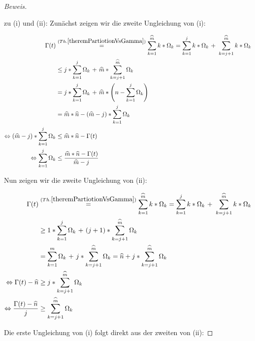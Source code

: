 \begin{proof}[Beweis] \textrm{ }

\vspace{0.3cm}

zu (i) und (ii): Zunächst zeigen wir die zweite Ungleichung von (i):

\begin{align*}
\Gamma(t) &\overset{(Th. \ref{theremPartiotionVsGamma})}{=} \sum_{k=1}^{\widehat{m}} k * \Omega_k = \sum_{k=1}^{j} k * \Omega_k \textrm{  +  } \sum_{k=j+1}^{\widehat{m}} k * \Omega_k \\
&\leq j * \sum_{k=1}^{j} \Omega_k \textrm{  +  } \widehat{m} * \sum_{k=j+1}^{\widehat{m}} \Omega_k \\
&= j * \sum_{k=1}^{j} \Omega_k \textrm{  +  } \widehat{m} * \left( n - \sum_{k=1}^{j} \Omega_k \right) \\
&= \widehat{m} * \widehat{n} - (\widehat{m} - j) * \sum_{k=1}^{j} \Omega_k \\
\Leftrightarrow (\widehat{m} - j) * \sum_{k=1}^{j} \Omega_k &\leq \widehat{m} * \widehat{n} - \Gamma(t) \\
\Leftrightarrow \sum_{k=1}^{j} \Omega_k &\leq \frac{\widehat{m} * \widehat{n} - \Gamma(t)}{\widehat{m} - j}
\end{align*}

\vspace{0.3cm}

Nun zeigen wir die zweite Ungleichung von (ii):

\begin{align*}
\Gamma(t) &\overset{(Th. \ref{theremPartiotionVsGamma})}{=} \sum_{k=1}^{\widehat{m}} k * \Omega_k = \sum_{k=1}^{j} k * \Omega_k \textrm{  +  } \sum_{k=j+1}^{\widehat{m}} k * \Omega_k \\
&\geq 1 * \sum_{k=1}^{j} \Omega_k \textrm{  +  } (j+1) * \sum_{k=j+1}^{\widehat{m}} \Omega_k \\
&= \sum_{k=1}^{m} \Omega_k \textrm{  +  } j * \sum_{k=j+1}^{\widehat{m}} \Omega_k = \widehat{n} + j * \sum_{k=j+1}^{\widehat{m}} \Omega_k \\
\Leftrightarrow \Gamma(t) - \widehat{n} &\geq j * \sum_{k=j+1}^{\widehat{m}} \Omega_k \\
\Leftrightarrow \frac{\Gamma(t) - \widehat{n}}{j} &\geq \sum_{k=j+1}^{\widehat{m}} \Omega_k
\end{align*}

\vspace{0.3cm}

Die erste Ungleichung von (i) folgt direkt aus der zweiten von (ii):


\end{proof}
